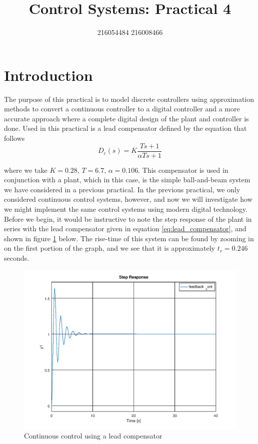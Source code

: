 \documentclass[a4paper, 12pt]{article}
\title{Control Systems: Practical 4}
\author{216054484 216008466}
\begin{document}
\maketitle
\newpage
{}
\tableofcontents
\listoffigures
\newpage
{}

\section{Introduction} %
\label{sec:introduction}
The purpose of this practical is to model discrete controllers using
approximation methods to convert a continuous controller to a digital
controller  and a more accurate approach where a complete digital design of the
plant and controller is done. Used in this practical is a lead compensator
defined by the equation that follows
\begin{equation}
	\label{eq:lead_compensator}
	D_c(s) = K \frac{Ts + 1}{\alpha Ts + 1}
\end{equation}

where we take $K = 0.28,\,T = 6.7,\,\alpha = 0.106$. This compensator is used
in conjunction with a plant, which in this case, is the simple ball-and-beam
system we have considered in a previous practical. In the previous practical,
we only considered continuous control systems, however, and now we will
investigate how we might implement the same control systems using modern
digital technology. Before we begin, it would be instructive to note the step
response of the plant in series with the lead compensator given in equation
\ref{eq:lead_compensator}, and shown in figure \ref{fig:continuous_control}
below. The rise-time of this system can be found by zooming in on the first
portion of the graph, and we see that it is approximately $t_r = 0.246$
seconds.

\begin{figure}[H]
  \centering
  \includegraphics[width=.8\textwidth]{img/continuous_control.png}
  \caption{Continuous control using a lead compensator}
  \label{fig:continuous_control}
\end{figure}
\end{document}
